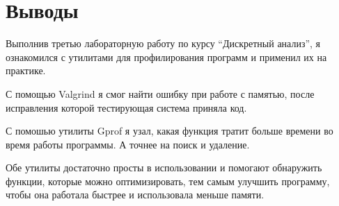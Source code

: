 \section{Выводы}

Выполнив третью лабораторную работу по курсу \enquote{Дискретный анализ}, 
я ознакомился с утилитами для профилирования программ и применил их на практике.

С помощью Valgrind я смог найти ошибку при работе с памятью, 
после исправления которой тестирующая система приняла код.

С помошью утилиты Gprof я узал, какая функция тратит больше времени во время работы программы. А точнее на поиск и удаление.

Обе утилиты достаточно просты в использовании и помогают обнаружить функции, 
которые можно оптимизировать, тем самым улучшить программу, чтобы она работала быстрее и использовала меньше памяти.
\pagebreak